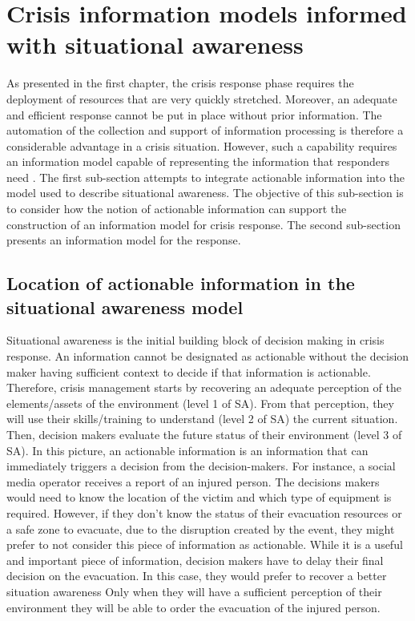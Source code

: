 \section{Crisis information models informed with situational awareness}
As presented in the first chapter, the crisis response phase requires the deployment of resources that are very quickly stretched.
Moreover, an adequate and efficient response cannot be put in place without prior information.
The automation of the collection and support of information processing is therefore a considerable advantage in a crisis situation.
However, such a capability requires an information model capable of representing the information that responders need \parencite{comesBringingStructureDisaster2015}.
The first sub-section attempts to integrate actionable information into the model used to describe situational awareness.
The objective of this sub-section is to consider how the notion of actionable information can support the construction of an information model for crisis response.
The second sub-section presents an information model for the response.

\subsection{Location of actionable information in the situational awareness model}
Situational awareness is the initial building block of decision making in crisis response.
An information cannot be designated as actionable without the decision maker having sufficient context to decide if that information is actionable.
Therefore, crisis management starts by recovering an adequate perception of the elements/assets of the environment (level 1 of SA).
From that perception, they will use their skills/training to understand (level 2 of SA) the current situation.
Then, decision makers evaluate the future status of their environment (level 3 of SA).
In this picture, an actionable information is an information that can immediately triggers a decision from the decision-makers.
For instance, a social media operator receives a report of an injured person.
The decisions makers would need to know the location of the victim and which type of equipment is required.
However, if they don't know the status of their evacuation resources or a safe zone to evacuate,
due to the disruption created by the event, they might prefer to not consider this piece of information as actionable.
While it is a useful and important piece of information, decision makers have to delay their final decision on the evacuation.
In this case, they would prefer to recover a better situation awareness
Only when they will have a sufficient perception of their environment they will be able to order the evacuation of the injured person.

